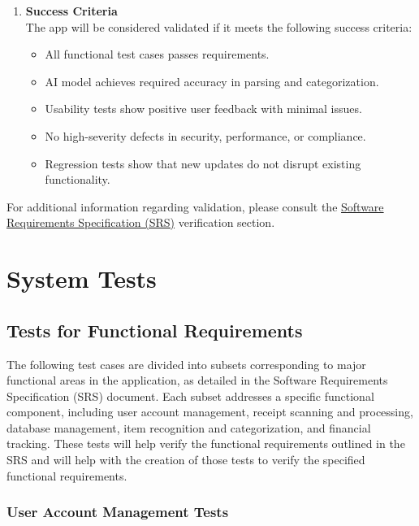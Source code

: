 \documentclass[12pt, titlepage]{article}
\begin{document}
\begin{enumerate}
\begin{itemize}
	\end{itemize}
	\item \textbf{Success Criteria} \\
	The app will be considered validated if it meets the following success criteria:
	\begin{itemize}
		\item All functional test cases passes requirements.
		\item AI model achieves required accuracy in parsing and categorization.
		\item Usability tests show positive user feedback with minimal issues.
		\item No high-severity defects in security, performance, or compliance.
		\item Regression tests show that new updates do not disrupt existing functionality.
	\end{itemize}
\end{enumerate}

\noindent For additional information regarding validation, please consult the \href{https://github.com/PlutosCapstone/Plutos/blob/main/docs/SRS/SRS.pdf}{Software Requirements Specification (SRS)} verification section.

\newpage
\section{System Tests}

\subsection{Tests for Functional Requirements}

The following test cases are divided into subsets corresponding to major functional areas in the application, as detailed in the Software Requirements Specification (SRS) document. 
Each subset addresses a specific functional component, including user account management, receipt scanning and processing, database management, item recognition and categorization, and financial tracking. 
These tests will help verify the functional requirements outlined in the SRS and will help with the creation of those tests to verify the specified functional requirements.

\subsubsection{User Account Management Tests}
\end{document}
